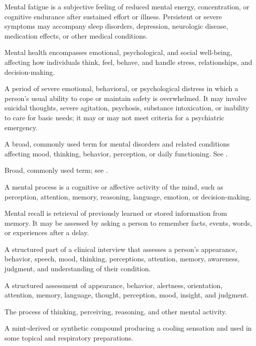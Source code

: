  Mental fatigue is a subjective feeling of reduced mental energy, concentration, or cognitive endurance after sustained effort or illness. Persistent or severe symptoms may accompany sleep disorders, depression, neurologic disease, medication effects, or other medical conditions.

 Mental health encompasses emotional, psychological, and social well-being, affecting how individuals think, feel, behave, and handle stress, relationships, and decision-making.

 A period of severe emotional, behavioral, or psychological distress in which a person’s usual ability to cope or maintain safety is overwhelmed. It may involve suicidal thoughts, severe agitation, psychosis, substance intoxication, or inability to care for basic needs; it may or may not meet criteria for a psychiatric emergency.

 A broad, commonly used term for mental disorders and related conditions affecting mood, thinking, behavior, perception, or daily functioning. See .

 Broad, commonly used term; see .

 A mental process is a cognitive or affective activity of the mind, such as perception, attention, memory, reasoning, language, emotion, or decision-making.

 Mental recall is retrieval of previously learned or stored information from memory. It may be assessed by asking a person to remember facts, events, words, or experiences after a delay.

 A structured part of a clinical interview that assesses a person's appearance, behavior, speech, mood, thinking, perceptions, attention, memory, awareness, judgment, and understanding of their condition.

 A structured assessment of appearance, behavior, alertness, orientation, attention, memory, language, thought, perception, mood, insight, and judgment.

 The process of thinking, perceiving, reasoning, and other mental activity.

 A mint-derived or synthetic compound producing a cooling sensation and used in some topical and respiratory preparations.

